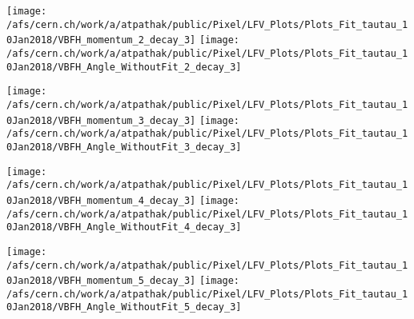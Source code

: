 \documentclass{beamer}
\begin{document}
\begin{frame}
\begin{normalsize}
\begin{center}
\texttt{[image: /afs/cern.ch/work/a/atpathak/public/Pixel/LFV\_Plots/Plots\_Fit\_tautau\_10Jan2018/VBFH\_momentum\_2\_decay\_3]}
\texttt{[image: /afs/cern.ch/work/a/atpathak/public/Pixel/LFV\_Plots/Plots\_Fit\_tautau\_10Jan2018/VBFH\_Angle\_WithoutFit\_2\_decay\_3]} 
\end{center}
\end{normalsize}
\end {frame}
\begin{frame}
\begin{normalsize}
\begin{center}
\texttt{[image: /afs/cern.ch/work/a/atpathak/public/Pixel/LFV\_Plots/Plots\_Fit\_tautau\_10Jan2018/VBFH\_momentum\_3\_decay\_3]}
\texttt{[image: /afs/cern.ch/work/a/atpathak/public/Pixel/LFV\_Plots/Plots\_Fit\_tautau\_10Jan2018/VBFH\_Angle\_WithoutFit\_3\_decay\_3]} 
\end{center}
\end{normalsize}
\end {frame}
\begin{frame}
\begin{normalsize}
\begin{center}
\texttt{[image: /afs/cern.ch/work/a/atpathak/public/Pixel/LFV\_Plots/Plots\_Fit\_tautau\_10Jan2018/VBFH\_momentum\_4\_decay\_3]}
\texttt{[image: /afs/cern.ch/work/a/atpathak/public/Pixel/LFV\_Plots/Plots\_Fit\_tautau\_10Jan2018/VBFH\_Angle\_WithoutFit\_4\_decay\_3]} 
\end{center}
\end{normalsize}
\end {frame}
\begin{frame}
\begin{normalsize}
\begin{center}
\texttt{[image: /afs/cern.ch/work/a/atpathak/public/Pixel/LFV\_Plots/Plots\_Fit\_tautau\_10Jan2018/VBFH\_momentum\_5\_decay\_3]}
\texttt{[image: /afs/cern.ch/work/a/atpathak/public/Pixel/LFV\_Plots/Plots\_Fit\_tautau\_10Jan2018/VBFH\_Angle\_WithoutFit\_5\_decay\_3]} 
\end{center}
\end{normalsize}
\end {frame}
\end{document}
